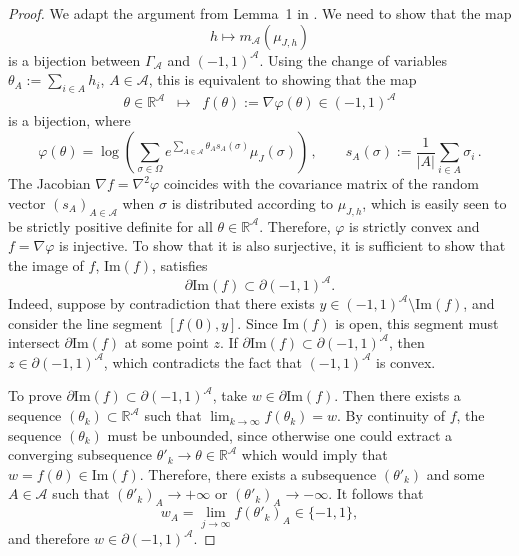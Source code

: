 \documentclass[11pt,reqno]{amsart}
\numberwithin{equation}{section}
\numberwithin{figure}{section}
\newcommand{\1}{\mathds{1}}
\let\si=\sigma
\let\O=\Omega
\let\G=\Gamma
\newcommand{\cA}{\ensuremath{\mathcal A}}
\newcommand{\bbR}{{\ensuremath{\mathbb R}} }
\begin{document}
\begin{proof}
We adapt %
the argument from Lemma~1 in \cite{BubeckEldan}. %
We need to show that the map 
\[
h \mapsto m_\cA(\mu_{J,h})
\]
is a bijection between $\G_\cA$ and $(-1,1)^\cA$. Using the change of variables $\theta_A:=\sum_{i\in A}h_i$, $A\in\cA$, this is equivalent to showing that  the map 
\begin{equation}
\theta %
\in\bbR^{\cA}
\;\;\longmapsto\;\; f(\theta) := \nabla \varphi(\theta) \in (-1,1)^\cA
\end{equation}
is a bijection, where 
\[
\varphi(\theta) = \log \left(\sum_{\si\in\O} e^{\sum_{A \in \cA} \theta_A s_A(\sigma)}%
\mu_J(\sigma)\right)\,,\qquad s_A (\si):= \frac{1}{|A|}\sum_{i \in A}\sigma_i\,.
\]
The Jacobian \(\nabla f = \nabla^2 \varphi \) coincides with the covariance matrix of the random vector \((s_A)_{A \in \cA}\) 
when \(\sigma\) is distributed according to \(\mu_{J,h}\), which is easily seen to be strictly positive definite for all $\theta\in\bbR^\cA$.  Therefore, $\varphi$ is strictly convex and $f=\nabla\varphi$ is injective.
To show that it is also surjective,   
it is sufficient to show that the image of $f$,  $\mathrm{Im}(f) $, satisfies 
\[
\partial \mathrm{Im}(f) \subset \partial (-1,1)^\cA.
\]
Indeed, suppose by contradiction that there exists \(y \in (-1,1)^\cA \setminus \mathrm{Im}(f)\), and consider the line segment \([f(0),y]\). Since \(\mathrm{Im}(f)\) is open, this segment must intersect \(\partial \mathrm{Im}(f)\) at some point \(z\). If $\partial \mathrm{Im}(f) \subset \partial (-1,1)^\cA$, then $z \in\partial (-1,1)^\cA$, which contradicts the fact that \((-1,1)^\cA\) is convex.

To prove $\partial \mathrm{Im}(f) \subset \partial (-1,1)^\cA$, take \(w \in \partial \mathrm{Im}(f)\). Then there exists a sequence \((\theta_k) \subset \mathbb{R}^\cA\) such that 
$\lim_{k \to \infty} f(\theta_k) = w$.
By continuity of \(f\), the sequence \((\theta_k)\) must be unbounded, since otherwise one could extract a converging subsequence $\theta'_k\to \theta\in\bbR^\cA$ which would imply that \(w=f(\theta) \in \mathrm{Im}(f)\).  
Therefore, there exists a subsequence \((\theta'_{k})\) and some \(A \in \cA\) such that \((\theta'_{k})_A \to + \infty\) or \((\theta'_{k})_A \to - \infty\).  
It follows that
\[
w_A = \lim_{j \to \infty} f(\theta'_{k})_A \in \{-1,1\}, 
\]
and therefore $w\in\partial (-1,1)^\cA$.
\end{proof}
\end{document}
